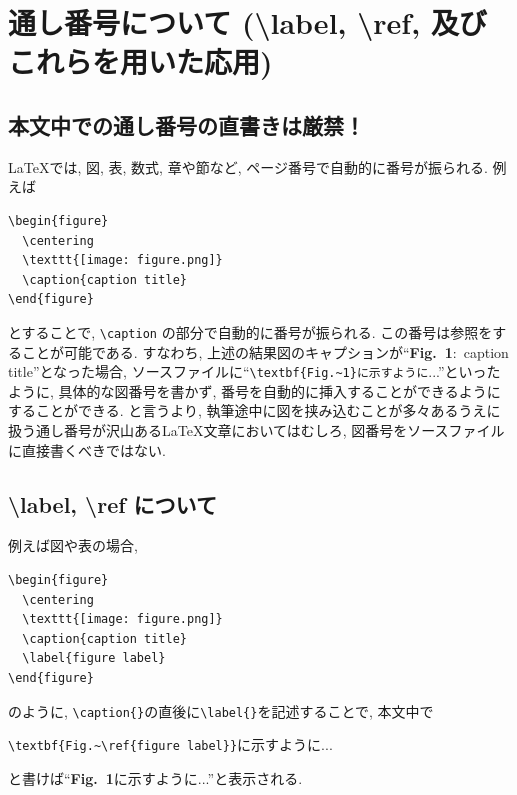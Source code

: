\section{通し番号について (\textbackslash label, \textbackslash ref, 及びこれらを用いた応用)}
\subsection{本文中での通し番号の直書きは厳禁！}
\LaTeX では, 図, 表, 数式, 章や節など, ページ番号で自動的に番号が振られる. 例えば
\begin{screen}
\begin{verbatim} 
\begin{figure}
  \centering
  \texttt{[image: figure.png]}
  \caption{caption title}
\end{figure}
\end{verbatim}
\end{screen}
とすることで, \verb|\caption| の部分で自動的に番号が振られる. この番号は参照をすることが可能である. すなわち, 上述の結果図のキャプションが``\textbf{Fig.~1}:~caption title''となった場合, ソースファイルに``\verb|\textbf{Fig.~1}に示すように|...''といったように, 具体的な図番号を書かず, 番号を自動的に挿入することができるようにすることができる. と言うより, 執筆途中に図を挟み込むことが多々あるうえに扱う通し番号が沢山ある\LaTeX 文章においてはむしろ, 図番号をソースファイルに直接書くべきではない. 

\subsection{\textbackslash label, \textbackslash ref について}
例えば図や表の場合, 
\begin{screen}
\begin{verbatim} 
\begin{figure}
  \centering
  \texttt{[image: figure.png]}
  \caption{caption title}
  \label{figure label}
\end{figure}
\end{verbatim}
\end{screen}
のように, \verb|\caption{}|の直後に\verb|\label{}|を記述することで, 本文中で
\begin{screen}
\verb|\textbf{Fig.~\ref{figure label}}|に示すように...
\end{screen}
と書けば``\textbf{Fig.~1}に示すように...''と表示される. 

